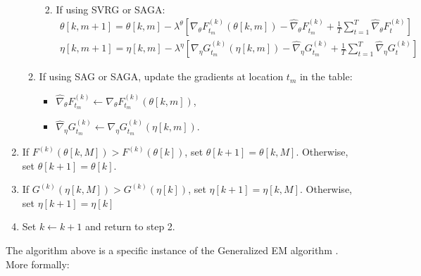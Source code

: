 \begin{enumerate}
\begin{enumerate}
\begin{enumerate}
\begin{gather}
            \end{gather}
            \item If using SVRG or SAGA:
            \begin{gather}
                \theta[k,m+1] = \theta[k,m] - \lambda^{\theta} \left[\nabla_\theta F_{t_m}^{(k)}(\theta[k,m]) - \widehat \nabla_\theta F_{t_m}^{(k)} + \frac{1}{T} \sum_{t=1}^T \widehat \nabla_\theta F^{(k)}_{t} \right] \\
                \eta[k,m+1] = \eta[k,m] - \lambda^{\eta} \left[\nabla_\eta G_{t_m}^{(k)}(\eta[k,m]) - \widehat \nabla_\eta G_{t_m}^{(k)} + \frac{1}{T} \sum_{t=1}^T \widehat \nabla_\eta G^{(k)}_{t} \right]
            \end{gather}
        \end{enumerate}
        \item If using SAG or SAGA, update the gradients at location $t_m$ in the table:
        \begin{itemize}
            \item $\widehat \nabla_\theta F_{t_m}^{(k)} \leftarrow \nabla_\theta F_{t_m}^{(k)}(\theta[k,m])$,
            \item $\widehat \nabla_\eta G_{t_m}^{(k)} \leftarrow \nabla_\eta G_{t_m}^{(k)}(\eta[k,m])$.
        \end{itemize}
    \end{enumerate}
    \item If $F^{(k)}(\theta[k,M]) > F^{(k)}(\theta[k])$, set $\theta[k+1] = \theta[k,M]$. Otherwise, set $\theta[k+1] = \theta[k]$.
    \item If $G^{(k)}(\eta[k,M]) > G^{(k)}(\eta[k])$, set $\eta[k+1] = \eta[k,M]$. Otherwise, set $\eta[k+1] = \eta[k]$
    \item Set $k \leftarrow k+1$ and return to step 2.
\end{enumerate}

The algorithm above is a specific instance of the Generalized EM algorithm \citep{Dempster:1977}. More formally:

